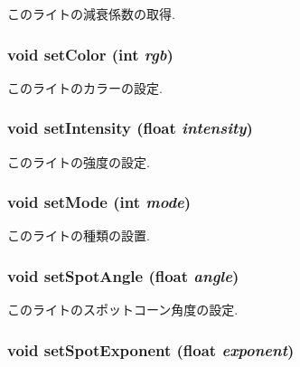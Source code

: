 このライトの減衰係数の取得. \hypertarget{classm3g_1_1Light_b1f5cc0f5cc6bbbd716a526c61f1081d}{
\subsubsection[{setColor}]{\setlength{\rightskip}{0pt plus 5cm}void setColor (int {\em rgb})}}
\label{classm3g_1_1Light_b1f5cc0f5cc6bbbd716a526c61f1081d}


このライトのカラーの設定. \hypertarget{classm3g_1_1Light_ce02325cb6289c007d569c193641c468}{
\subsubsection[{setIntensity}]{\setlength{\rightskip}{0pt plus 5cm}void setIntensity (float {\em intensity})}}
\label{classm3g_1_1Light_ce02325cb6289c007d569c193641c468}


このライトの強度の設定. \hypertarget{classm3g_1_1Light_9f407b18ba6235cb96fa95611c1ea3a4}{
\subsubsection[{setMode}]{\setlength{\rightskip}{0pt plus 5cm}void setMode (int {\em mode})}}
\label{classm3g_1_1Light_9f407b18ba6235cb96fa95611c1ea3a4}


このライトの種類の設置. \hypertarget{classm3g_1_1Light_30ce206b37f6ed5e918fbc75b3f91072}{
\subsubsection[{setSpotAngle}]{\setlength{\rightskip}{0pt plus 5cm}void setSpotAngle (float {\em angle})}}
\label{classm3g_1_1Light_30ce206b37f6ed5e918fbc75b3f91072}


このライトのスポットコーン角度の設定. \hypertarget{classm3g_1_1Light_787eb66801e17d0412559598326ce19d}{
\subsubsection[{setSpotExponent}]{\setlength{\rightskip}{0pt plus 5cm}void setSpotExponent (float {\em exponent})}}
\label{classm3g_1_1Light_787eb66801e17d0412559598326ce19d}


